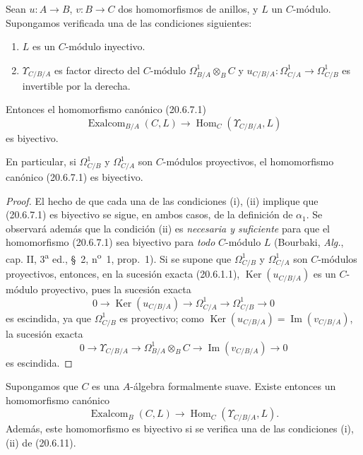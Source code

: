 \begin{theorem}[20.6.11]
\label{0.20.6.11-fr}
Sean $u:A\to B$, $v:B\to C$ dos homomorfismos de anillos, y $L$ un
$C$-módulo. Supongamos verificada una de las condiciones siguientes:
\begin{enumerate}
  \item[\rm(i)] $L$ es un $C$-módulo inyectivo.
  \item[\rm(ii)] $\Upsilon_{C/B/A}$ es factor directo del $C$-módulo
$\Omega^1_{B/A}\otimes_B C$ y
$u_{C/B/A}:\Omega^1_{C/A}\to\Omega^1_{C/B}$ es invertible por la derecha.
\end{enumerate}
Entonces el homomorfismo canónico \textup{(20.6.7.1)}
\[
  \operatorname{Exalcom}_{B/A}(C,L)\longrightarrow
  \operatorname{Hom}_C(\Upsilon_{C/B/A},L)
\]
es biyectivo.

En particular, si $\Omega^1_{C/B}$ y $\Omega^1_{C/A}$ son
$C$-módulos proyectivos, el homomorfismo canónico \textup{(20.6.7.1)} es
biyectivo.
\end{theorem}

\begin{proof}
El hecho de que cada una de las condiciones (i), (ii) implique que (20.6.7.1) es
biyectivo se sigue, en ambos casos, de la definición de $\alpha_1$. Se observará
además que la condición (ii) es \emph{necesaria y
suficiente} para que el homomorfismo (20.6.7.1) sea biyectivo para
\emph{todo} $C$-módulo $L$ (Bourbaki, \emph{Alg.}, cap. II,
3\textsuperscript{a} ed., \S~2, n\textsuperscript{o}~1, prop.~1). Si se
supone que $\Omega^1_{C/B}$ y $\Omega^1_{C/A}$ son $C$-módulos
proyectivos, entonces, en la sucesión exacta (20.6.1.1),
$\operatorname{Ker}(u_{C/B/A})$ es un $C$-módulo proyectivo, pues la sucesión exacta
\[
  0\longrightarrow\operatorname{Ker}(u_{C/B/A})\longrightarrow\Omega^1_{C/A}
  \longrightarrow\Omega^1_{C/B}\longrightarrow0
\]
es escindida, ya que $\Omega^1_{C/B}$ es proyectivo; como
$\operatorname{Ker}(u_{C/B/A})=\operatorname{Im}(v_{C/B/A})$, la sucesión exacta
\[
  0\longrightarrow\Upsilon_{C/B/A}\longrightarrow
  \Omega^1_{B/A}\otimes_B C\longrightarrow
  \operatorname{Im}(v_{C/B/A})\longrightarrow0
\]
es escindida.
\end{proof}

\begin{corollary}[20.6.12]
\label{0.20.6.12-fr}
Supongamos que $C$ es una $A$-álgebra formalmente suave. Existe entonces
un homomorfismo canónico
\begin{equation}
\tag{20.6.12.1}
\label{0.20.6.12.1-fr}
  \operatorname{Exalcom}_B(C,L)\longrightarrow
  \operatorname{Hom}_C(\Upsilon_{C/B/A},L).
\end{equation}
Además, este homomorfismo es biyectivo si se verifica una de las condiciones \textup{(i)},
\textup{(ii)} de \textup{(20.6.11)}.
\end{corollary}

